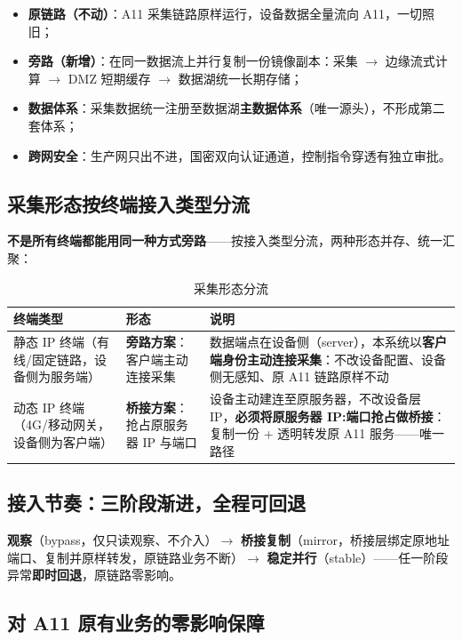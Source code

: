 \documentclass[11pt,a4paper]{ctexart}
\begin{document}
\begin{itemize}[leftmargin=*]
  \item \textbf{原链路（不动）}：A11 采集链路原样运行，设备数据全量流向 A11，一切照旧；
  \item \textbf{旁路（新增）}：在同一数据流上并行复制一份镜像副本：采集 $\rightarrow$ 边缘流式计算 $\rightarrow$ DMZ 短期缓存 $\rightarrow$ 数据湖统一长期存储；
  \item \textbf{数据体系}：采集数据统一注册至数据湖\textbf{主数据体系}（唯一源头），不形成第二套体系；
  \item \textbf{跨网安全}：生产网只出不进，国密双向认证通道，控制指令穿透有独立审批。
\end{itemize}

\subsection{采集形态按终端接入类型分流}

\textbf{不是所有终端都能用同一种方式旁路}——按接入类型分流，两种形态并存、统一汇聚：

\begin{table}[H]\centering
\caption{采集形态分流}
\begin{tabular}{p{2.8cm} p{5.0cm} p{5.0cm}}
\toprule
\textbf{终端类型} & \textbf{形态} & \textbf{说明} \\
\midrule
静态 IP 终端（有线/固定链路，设备侧为服务端） & \textbf{旁路方案}：客户端主动连接采集 & 数据端点在设备侧（server），本系统以\textbf{客户端身份主动连接采集}：不改设备配置、设备侧无感知、原 A11 链路原样不动 \\
动态 IP 终端（4G/移动网关，设备侧为客户端） & \textbf{桥接方案}：抢占原服务器 IP 与端口 & 设备主动建连至原服务器，不改设备层 IP，\textbf{必须将原服务器 IP:端口抢占做桥接}：复制一份 + 透明转发原 A11 服务——唯一路径 \\
\bottomrule
\end{tabular}
\end{table}

\subsection{接入节奏：三阶段渐进，全程可回退}

\textbf{观察}（bypass，仅只读观察、不介入）$\rightarrow$ \textbf{桥接复制}（mirror，桥接层绑定原地址端口、复制并原样转发，原链路业务不断）$\rightarrow$ \textbf{稳定并行}（stable）——任一阶段异常\textbf{即时回退}，原链路零影响。

\subsection{对 A11 原有业务的零影响保障}
\end{document}
